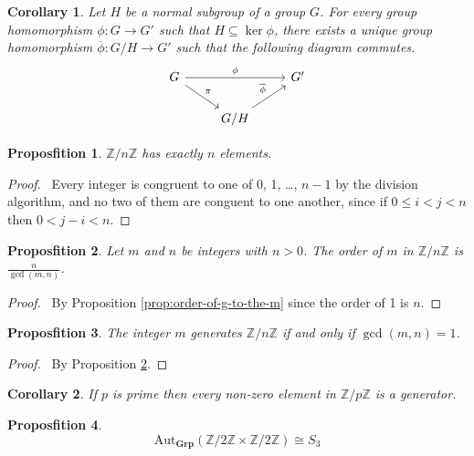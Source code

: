 \documentclass{book}
\let\qed\relax
\newtheorem{prop}{Proposfition}[chapter]
\newtheorem{cor}{Corollary}[prop]
\theoremstyle{definition}
\newcommand{\Aut}[2]{\ensuremath{\mathrm{Aut}_{#1} \left( {#2} \right)}}
\newcommand{\Grp}{\ensuremath{\mathbf{Grp}}}
\begin{document}
\begin{cor}
Let $H$ be a normal subgroup of a group $G$. For every group homomorphism $\phi : G \rightarrow G'$ such that $H \subseteq \ker \phi$, there exists a unique group homomorphism $\overline{\phi} : G / H \rightarrow G'$ such that the following diagram commutes.
\[ \begin{tikzcd}
G \arrow[rr,"\phi"]  \arrow[dr,"\pi"] & & G' \\
& G/ H\arrow[ur,"\overline{\phi}"]
\end{tikzcd} \]
\end{cor}

\begin{prop}
    $\mathbb{Z} / n \mathbb{Z}$ has exactly $n$ elements.
\end{prop}

\begin{proof}
    \pf\ Every integer is congruent to one of 0, 1, \ldots, $n - 1$ by the division algorithm, and no two of them are conguent to one another, since if $0 \leq i < j < n$ then $0 < j - i < n$. \qed
\end{proof}

\begin{prop}
    \label{prop:order-of-m-in-ZnZ}
    Let $m$ and $n$ be integers with $n > 0$. The order of $m$ in $\mathbb{Z} / n \mathbb{Z}$ is $\frac{n}{\gcd(m,n)}$.
\end{prop}

\begin{proof}
    \pf\ By Proposition \ref{prop:order-of-g-to-the-m} since the order of 1 is $n$. \qed
\end{proof}

\begin{prop}
    The integer $m$ generates $\mathbb{Z} / n \mathbb{Z}$ if and only if $\gcd(m,n) = 1$.
\end{prop}

\begin{proof}
    \pf\ By Proposition \ref{prop:order-of-m-in-ZnZ}. \qed
\end{proof}

\begin{cor}
    If $p$ is prime then every non-zero element in $\mathbb{Z} / p \mathbb{Z}$ is a generator.
\end{cor}

\begin{prop}
    \[ \Aut{\Grp}{\mathbb{Z} / 2 \mathbb{Z} \times \mathbb{Z} / 2 \mathbb{Z}} \cong S_3 \]
\end{prop}
\end{document}
